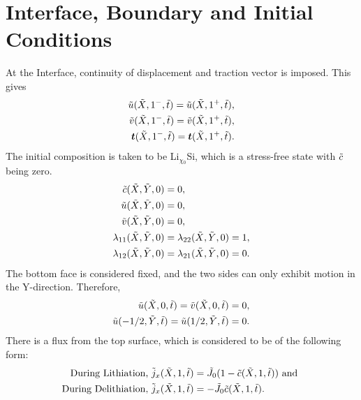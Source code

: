 \section{Interface, Boundary and Initial Conditions}
At the Interface, continuity of displacement and traction vector is imposed. This gives
\begin{align}
    \tilde{u}(\tilde{X}, 1^{-}, \tilde{t}) = \tilde{u}(\tilde{X}, 1^{+}, \tilde{t}), \\
    \tilde{v}(\tilde{X}, 1^{-}, \tilde{t}) = \tilde{v}(\tilde{X}, 1^{+}, \tilde{t}), \\
    \bm{t}(\tilde{X}, 1^{-}, \tilde{t}) = \bm{t}(\tilde{X}, 1^{+}, \tilde{t}).
\end{align}
The initial composition is taken to be Li$_{\chi{_{0}}}$Si, which is a stress-free state with $\tilde{c}$ being zero.
\begin{align}
    \tilde{c}(\tilde{X}, \tilde{Y}, 0) &= 0, \\
    \tilde{u}(\tilde{X}, \tilde{Y}, 0) &= 0,\\
    \tilde{v}(\tilde{X}, \tilde{Y}, 0) &= 0, \\
    \lambda_{11}(\tilde{X}, \tilde{Y}, 0) &= \lambda_{22}(\tilde{X}, \tilde{Y}, 0) = 1, \\
    \lambda_{12}(\tilde{X}, \tilde{Y}, 0) &= \lambda_{21}(\tilde{X}, \tilde{Y}, 0) = 0.
\end{align}
The bottom face is considered fixed, and the two sides can only exhibit motion in the Y-direction. Therefore,
\begin{align}
    \tilde{u}(\tilde{X}, 0, \tilde{t}) = \tilde{v}(\tilde{X}, 0, \tilde{t}) = 0, \\
    \tilde{u}(-1/2, \tilde{Y}, \tilde{t}) =  \tilde{u}(1/2, \tilde{Y}, \tilde{t}) = 0.
\end{align}
There is a flux from the top surface, which is considered to be of the following form: 
\begin{align}
    \text{During Lithiation, }\tilde{j}_x(\tilde{X}, 1, \tilde{t}) &= \tilde{J}_0 (1 - \tilde{c}(\tilde{X}, 1, \tilde{t})) \text{ and } \\
    \text{During Delithiation, }\tilde{j}_x(\tilde{X}, 1, \tilde{t}) &= -\tilde{J}_0 \tilde{c}(\tilde{X}, 1, \tilde{t}).
\end{align} 
\vspace{4em}
